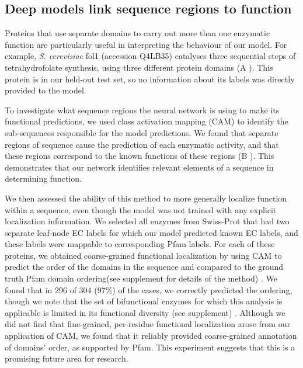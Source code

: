   
\subsection*{Deep models link sequence regions to function}
Proteins that use separate domains to carry out more than one enzymatic function are particularly useful in interpreting the behaviour of our model. For example, \textit{S. cerevisiae} fol1 (accession Q4LB35) catalyses three sequential steps of tetrahydrofolate synthesis, using three different protein domains (A%
). This protein is in our held-out test set, so no information about its labels was directly provided to the model.

To investigate what sequence regions the neural network is using to make its functional predictions, we used class activation mapping (CAM) \citep{classactivationmapping} to identify the sub-sequences responsible for the model predictions. We found that separate regions of sequence cause the prediction of each enzymatic activity, and that these regions correspond to the known functions of these regions (B%
).  This demonstrates that our network identifies relevant elements of a sequence in determining function. 


We then assessed the ability of this method to more generally localize function within a sequence, even though the model was not trained with any explicit localization information. We selected all enzymes from Swiss-Prot that had two separate leaf-node EC labels for which our model predicted known EC labels, and these labels were mappable to corresponding Pfam labels. For each of these proteins, we obtained coarse-grained functional localization by using CAM to predict the order of the domains in the sequence and compared to the ground truth Pfam domain ordering\textnormal{(see supplement for details of the method)}%
. We found that in 296 of 304 (97\%) of the cases, we correctly predicted the ordering, though we note that the set of bifunctional enzymes for which this analysis is applicable is limited in its functional diversity \textnormal{(see supplement)}%
. Although we did not find that fine-grained, per-residue functional localization arose from our application of CAM, we found that it reliably provided coarse-grained annotation of domains' order, as supported by Pfam. This experiment suggests that this is a promising future area for research.
